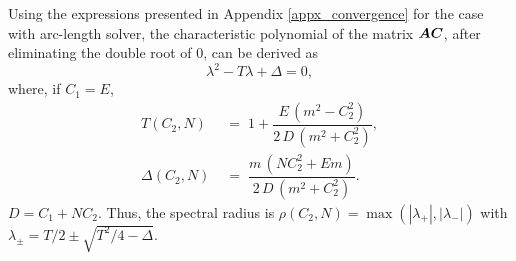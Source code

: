\documentclass[10pt]{cas-sc}
\begin{document}

 Using the expressions presented in Appendix \ref{appx_convergence} for the case with arc-length solver, the characteristic polynomial of the matrix $\mbox{\boldmath $A$} \mbox{\boldmath $C$}$, after eliminating the double root of $0$, can be derived as
\begin{equation}
	\lambda^2 -T \lambda +\Delta =0,
\end{equation}
where, if $C_1=E$,
\begin{align}
	T(C_2,N) &\;=\; 1 + \dfrac{E\,(m^2 - C_2^2)}{2\,D\,(m^2+C_2^2)}, \label{eq:T}\\[4pt]
	\Delta(C_2,N) &\;=\; \dfrac{m\,(N C_2^2 + E m)}{2\,D\,(m^2+C_2^2)}. \label{eq:Delta}
\end{align}
$D=C_1+NC_2$. Thus, the spectral radius is $\rho(C_2,N) = \max(|\lambda_+|,|\lambda_-|)$ with $\lambda_\pm = T/2 \pm \sqrt{T^2/4 - \Delta}$. 
\end{document}
